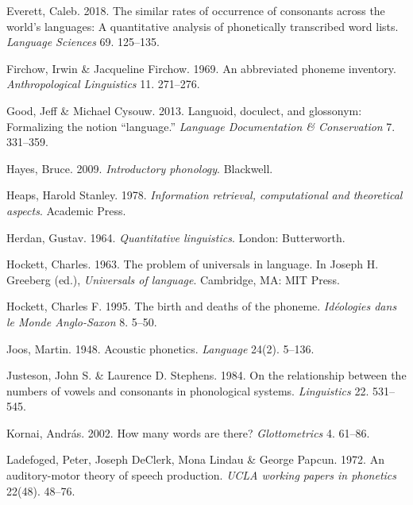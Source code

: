 \documentclass[
]{article}
\newlength{\cslhangindent}
\newlength{\cslentryspacingunit} %
\newenvironment{CSLReferences}[2] %
 {%
  \setlength{\parindent}{0pt}
  \ifodd #1
  \let\oldpar\par
  \def\par{\hangindent=\cslhangindent\oldpar}
  \fi
  \setlength{\parskip}{#2\cslentryspacingunit}
 }%
 {}
\begin{document}
\begin{CSLReferences}{1}{0}
\leavevmode{}%
Everett, Caleb. 2018. The similar rates of occurrence of consonants
across the world's languages: A quantitative analysis of phonetically
transcribed word lists. \emph{Language Sciences} 69. 125--135.

\leavevmode{}%
Firchow, Irwin \& Jacqueline Firchow. 1969. An abbreviated phoneme
inventory. \emph{Anthropological Linguistics} 11. 271--276.

\leavevmode{}%
Good, Jeff \& Michael Cysouw. 2013. Languoid, doculect, and glossonym:
Formalizing the notion {``language.''} \emph{Language Documentation \&
Conservation} 7. 331--359.

\leavevmode{}%
Hayes, Bruce. 2009. \emph{Introductory phonology}. Blackwell.

\leavevmode{}%
Heaps, Harold Stanley. 1978. \emph{Information retrieval, computational
and theoretical aspects}. Academic Press.

\leavevmode{}%
Herdan, Gustav. 1964. \emph{Quantitative linguistics}. London:
Butterworth.

\leavevmode{}%
Hockett, Charles. 1963. The problem of universals in language. In Joseph
H. Greeberg (ed.), \emph{Universals of language}. Cambridge, MA: MIT
Press.

\leavevmode{}%
Hockett, Charles F. 1995. The birth and deaths of the phoneme.
\emph{Id{é}ologies dans le Monde Anglo-Saxon} 8. 5--50.

\leavevmode{}%
Joos, Martin. 1948. Acoustic phonetics. \emph{Language} 24(2). 5--136.

\leavevmode{}%
Justeson, John S. \& Laurence D. Stephens. 1984. On the relationship
between the numbers of vowels and consonants in phonological systems.
\emph{Linguistics} 22. 531--545.

\leavevmode{}%
Kornai, András. 2002. {How many words are there?} \emph{Glottometrics}
4. 61--86.

\leavevmode{}%
Ladefoged, Peter, Joseph DeClerk, Mona Lindau \& George Papcun. 1972. An
auditory-motor theory of speech production. \emph{{UCLA} working papers
in phonetics} 22(48). 48--76.


\end{CSLReferences}
\end{document}
